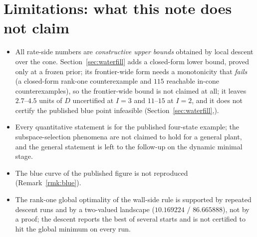 \section{Limitations: what this note does not claim}
\begin{itemize}
 \item All rate-side numbers are \emph{constructive upper bounds} obtained by
 local descent over the cone. Section~\ref{sec:waterfill} adds a
 closed-form lower bound, proved only at a frozen prior; its frontier-wide
 form needs a monotonicity that \emph{fails} (a closed-form rank-one
 counterexample and $115$ reachable in-cone counterexamples), so the
 frontier-wide bound is not claimed at all; it leaves
 $2.7$--$4.5$ units of $D$ uncertified at $I=3$ and $11$--$15$ at $I=2$,
 and it does not certify the published blue point infeasible
 (Section~\ref{sec:waterfill},).
 \item Every quantitative statement is for the published four-state example;
 the subspace-selection phenomena are not claimed to hold for a general
 plant, and the general statement is left to the follow-up on the dynamic
 minimal stage.
 \item The blue curve of the published figure is not reproduced
 (Remark~\ref{rmk:blue}).
 \item The rank-one global optimality of the wall-side rule is supported by
 repeated descent runs and by a two-valued landscape
 ($10.169224$ / $86.665888$), not by a proof; the descent reports the
 best of several starts and is not certified to hit the global minimum on
 every run.
\end{itemize}
